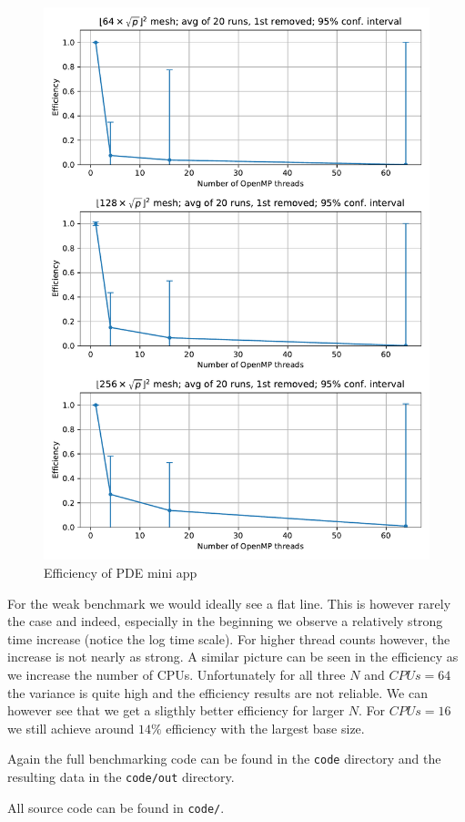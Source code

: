 \documentclass[unicode,11pt,a4paper,oneside,numbers=endperiod,openany]{scrartcl}
\begin{document}
\begin{figure}[h!t]
    \includegraphics[width=\textwidth]{plots/weak_efficiency.pdf}
    \caption{Efficiency of PDE mini app}
    \label{fig:weak_efficiency}
\end{figure}

For the weak benchmark we would ideally see a flat line. This is however rarely the case and indeed, especially in the beginning we observe a relatively strong time increase (notice the log time scale). For higher thread counts however, the increase is not nearly as strong. A similar picture can be seen in the efficiency as we increase the number of CPUs. Unfortunately for all three $N$ and $CPUs=64$ the variance is quite high and the efficiency results are not reliable. We can however see that we get a sligthly better efficiency for larger $N$. For $CPUs=16$ we still achieve around $14\%$ efficiency with the largest base size.

Again the full benchmarking code can be found in the \texttt{code} directory and the resulting data in the \texttt{code/out} directory.

All source code can be found in \texttt{code/}.
\end{document}
